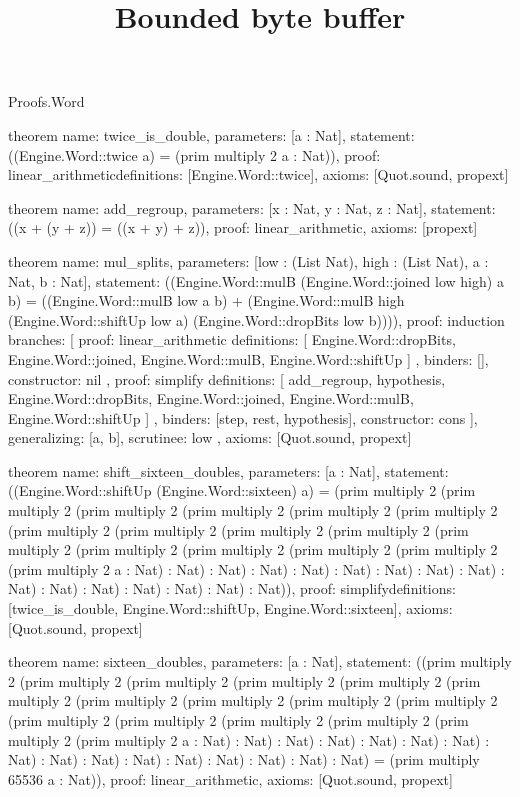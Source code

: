 \begin{lexlean}{Proofs.Word}
\title{Bounded byte buffer}
\begin{semanticmodule}
theorem{
  name: twice_is_double,
  parameters: [a : Nat],
  statement: ((Engine.Word::twice a) = (prim multiply 2 a : Nat)),
  proof: linear_arithmetic{definitions: [Engine.Word::twice]},
  axioms: [Quot.sound, propext]
}

theorem{
  name: add_regroup,
  parameters: [x : Nat, y : Nat, z : Nat],
  statement: ((x + (y + z)) = ((x + y) + z)),
  proof: linear_arithmetic{},
  axioms: [propext]
}

theorem{
  name: mul_splits,
  parameters: [low : (List Nat), high : (List Nat), a : Nat, b : Nat],
  statement: ((Engine.Word::mulB (Engine.Word::joined low high) a b) = ((Engine.Word::mulB low a b) + (Engine.Word::mulB high (Engine.Word::shiftUp low a) (Engine.Word::dropBits low b)))),
  proof: induction{
    branches: [
      {
        proof: linear_arithmetic{
          definitions: [
            Engine.Word::dropBits,
            Engine.Word::joined,
            Engine.Word::mulB,
            Engine.Word::shiftUp
          ]
        },
        binders: [],
        constructor: nil
      },
      {
        proof: simplify{
          definitions: [
            add_regroup,
            hypothesis,
            Engine.Word::dropBits,
            Engine.Word::joined,
            Engine.Word::mulB,
            Engine.Word::shiftUp
          ]
        },
        binders: [step, rest, hypothesis],
        constructor: cons
      }
    ],
    generalizing: [a, b],
    scrutinee: low
  },
  axioms: [Quot.sound, propext]
}

theorem{
  name: shift_sixteen_doubles,
  parameters: [a : Nat],
  statement: ((Engine.Word::shiftUp (Engine.Word::sixteen) a) = (prim multiply 2 (prim multiply 2 (prim multiply 2 (prim multiply 2 (prim multiply 2 (prim multiply 2 (prim multiply 2 (prim multiply 2 (prim multiply 2 (prim multiply 2 (prim multiply 2 (prim multiply 2 (prim multiply 2 (prim multiply 2 (prim multiply 2 (prim multiply 2 a : Nat) : Nat) : Nat) : Nat) : Nat) : Nat) : Nat) : Nat) : Nat) : Nat) : Nat) : Nat) : Nat) : Nat) : Nat) : Nat)),
  proof: simplify{definitions: [twice_is_double, Engine.Word::shiftUp, Engine.Word::sixteen]},
  axioms: [Quot.sound, propext]
}

theorem{
  name: sixteen_doubles,
  parameters: [a : Nat],
  statement: ((prim multiply 2 (prim multiply 2 (prim multiply 2 (prim multiply 2 (prim multiply 2 (prim multiply 2 (prim multiply 2 (prim multiply 2 (prim multiply 2 (prim multiply 2 (prim multiply 2 (prim multiply 2 (prim multiply 2 (prim multiply 2 (prim multiply 2 (prim multiply 2 a : Nat) : Nat) : Nat) : Nat) : Nat) : Nat) : Nat) : Nat) : Nat) : Nat) : Nat) : Nat) : Nat) : Nat) : Nat) : Nat) = (prim multiply 65536 a : Nat)),
  proof: linear_arithmetic{},
  axioms: [Quot.sound, propext]
}


\end{semanticmodule}
\end{lexlean}

